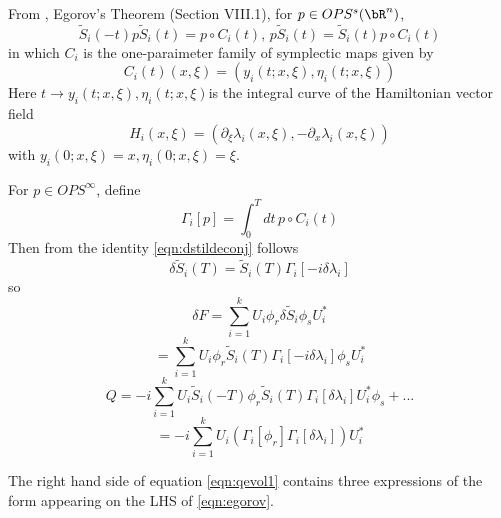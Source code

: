 From \cite{Tay:81}, Egorov's Theorem (Section VIII.1), for $p \in OPS^s(\bR^n)$,
\begin{equation}
  \label{eqn:egorov}
   \tilde{S}_i(-t) p \tilde{S}_i(t)=  p \circ C_i(t),\, p\tilde{S}_i(t) =
   \tilde{S}_i(t)p \circ C_i(t)
\end{equation}
in which $C_i$ is the one-paraimeter family of symplectic maps given by
\begin{equation}
  \label{eqn:canon}
  C_i(t)(x,\xi)=(y_i(t;x,\xi),\eta_i(t;x,\xi))
\end{equation}
Here $t \rightarrow y_i(t;x,\xi),\eta_i(t;x,\xi) $is the integral curve of the
Hamiltonian vector field
\[
  H_i(x,\xi) = (\partial_{\xi}\lambda_i(x,\xi), - \partial_x\lambda_i(x,\xi))
\]
with $y_i(0;x,\xi)=x, \eta_i(0;x,\xi)=\xi$.

For $p \in OPS^{\infty}$, define
\[
  \Gamma_i[p] = \int_0^T dt \, p \circ C_i(t)
\]
Then from the identity \ref{eqn:dstildeconj} follows
\[
  \delta\tilde{S}_i(T) = \tilde{S}_i(T) \Gamma_i[ -i \delta \lambda_i]
\] 
so
\[
  \delta F = \sum_{i=1}^k U_i \phi_r \delta \tilde{S}_i \phi_s U_i^*
\]
\[
  =\sum_{i=1}^k U_i \phi_r \tilde{S}_i(T) \Gamma_i[ -i \delta \lambda_i]\phi_s U_i^*
\]
\[
 Q = -i\sum_{i=1}^k U_i \tilde{S}_i(-T) \phi_r \tilde{S}_i(T) \Gamma_i[\delta \lambda_i] U_i^*\phi_s
  + ...
\]
\[
  = -i \sum_{i=1}^k U_i (\Gamma_i[\phi_r] \Gamma_i[\delta \lambda_i] )
  U_i^*
\]

 
The right hand side of equation \ref{eqn:qevol1} contains three
expressions of the form appearing on the LHS of \ref{eqn:egorov}.

